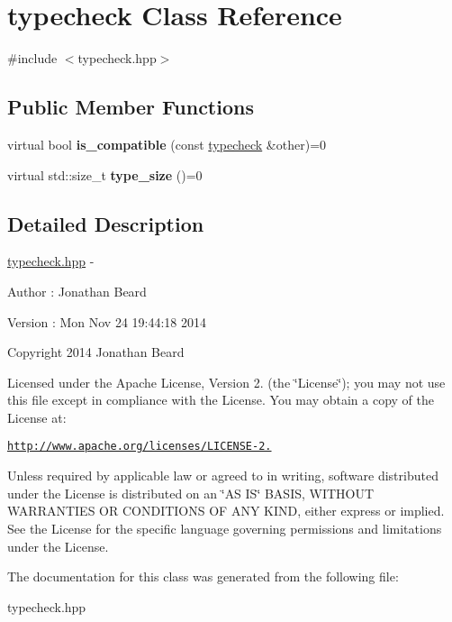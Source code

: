 \hypertarget{classtypecheck}{}\section{typecheck Class Reference}
\label{classtypecheck}


{\ttfamily \#include $<$typecheck.\+hpp$>$}

\subsection*{Public Member Functions}
\begin{DoxyCompactItemize}
\item 
\hypertarget{classtypecheck_a4af7e7b2f8a32d67bde069f7299c8e7f}{}virtual bool {\bfseries is\+\_\+compatible} (const \hyperlink{classtypecheck}{typecheck} \&other)=0\label{classtypecheck_a4af7e7b2f8a32d67bde069f7299c8e7f}

\item 
\hypertarget{classtypecheck_ab6e6b23972084805677daa38307df92a}{}virtual std\+::size\+\_\+t {\bfseries type\+\_\+size} ()=0\label{classtypecheck_ab6e6b23972084805677daa38307df92a}

\end{DoxyCompactItemize}


\subsection{Detailed Description}
\hyperlink{typecheck_8hpp_source}{typecheck.\+hpp} -\/ \begin{DoxyAuthor}{Author}
\+: Jonathan Beard 
\end{DoxyAuthor}
\begin{DoxyVersion}{Version}
\+: Mon Nov 24 19\+:44\+:18 2014
\end{DoxyVersion}
Copyright 2014 Jonathan Beard

Licensed under the Apache License, Version 2. (the \char`\"{}\+License\char`\"{}); you may not use this file except in compliance with the License. You may obtain a copy of the License at\+:

\href{http://www.apache.org/licenses/LICENSE-2.0}{\tt http\+://www.\+apache.\+org/licenses/\+L\+I\+C\+E\+N\+S\+E-\/2.}

Unless required by applicable law or agreed to in writing, software distributed under the License is distributed on an \char`\"{}\+A\+S I\+S\char`\"{} B\+A\+S\+I\+S, W\+I\+T\+H\+O\+U\+T W\+A\+R\+R\+A\+N\+T\+I\+E\+S O\+R C\+O\+N\+D\+I\+T\+I\+O\+N\+S O\+F A\+N\+Y K\+I\+N\+D, either express or implied. See the License for the specific language governing permissions and limitations under the License. 

The documentation for this class was generated from the following file\+:\begin{DoxyCompactItemize}
\item 
typecheck.\+hpp\end{DoxyCompactItemize}
